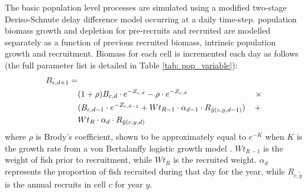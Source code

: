 \documentclass[review]{elsarticle}
\begin{document}
The basic population level processes are simulated using a modified two-stage
Deriso-Schnute delay difference model \citep{Deriso1980, Schnute1985,
	Dichmont2003} occurring at a daily time-step. 
 population
biomass growth and depletion for pre-recruits and 
recruited   are modelled
separately as a function of previous recruited biomass, intrinsic population
growth and recruitment. Biomass for each cell is incremented each day as
follows (the full parameter list is detailed in Table \ref{tab: pop_variable}):
\begin{equation*}
	\begin{split}
	B_{c,d+1} = &\\
	& (1 + \rho) B_{c,d} \cdot e^{-Z_{c,d}} - \rho \cdot e^{-Z_{c,d}} \hspace{2.9cm}
	\times \\  
	& (B_{c,d-1} \cdot e^{-Z_{c,d-1}} + Wt_{R-1} \cdot \alpha_{d-1} \cdot
	R_{\tilde{y}(c,y,d-1)})
	\hspace{0.4cm} + \\
	& Wt_{R} \cdot \alpha_{d} \cdot R_{\tilde{y}(c,y,d)} 
	\end{split}
\end{equation*}
where $\rho$ is Brody's coefficient, shown to be approximately equal to
$e^{-K}$ when $K$ is the growth rate from a von Bertalanffy logistic growth
model \citep{Schnute1985}. $Wt_{R-1}$ is the weight of fish prior to
recruitment, while $Wt_{R}$ is the recruited weight. $\alpha_{d}$ represents
the proportion of fish recruited during that day for the year, while
$R_{c,\tilde{y}}$ is the annual recruits in cell $c$ for year $y$. \\
\end{document}
